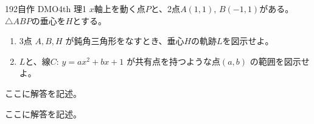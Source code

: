 \begin{prob}{192}{}{自作 DMO4th 理1}
 $x$軸上を動く点$P$と、2点$A(1,1)$, $B(-1,1)$がある。$\triangle{ABP}$の垂心を$H$とする。
 \begin{enumerate}
  \item 3点 $A, B, H$ が鈍角三角形をなすとき、垂心$H$の軌跡$L$を図示せよ。
  \item $L$と、線$C:\, y=ax^2+bx+1$ が共有点を持つような点$(a,b)$ の範囲を図示せよ。
 \end{enumerate}
\end{prob}
ここに解答を記述。

ここに解答を記述。